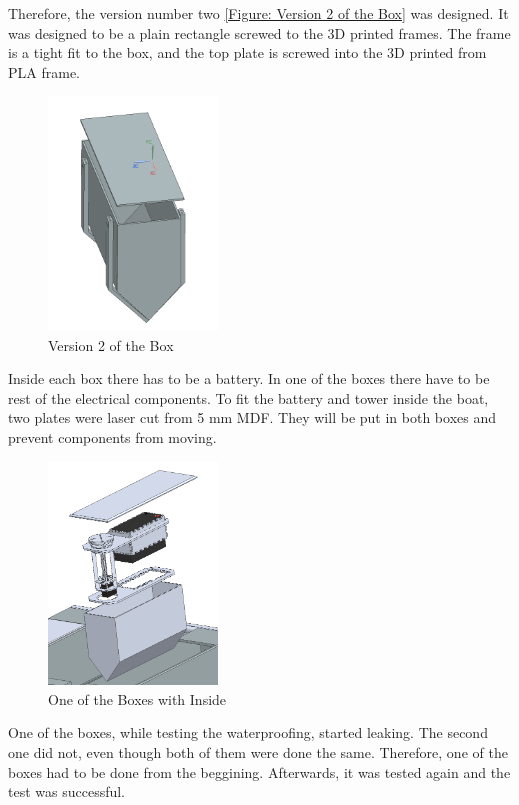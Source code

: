 Therefore, the version number two \autoref{Figure: Version 2 of the Box} was designed. It was designed to be a plain rectangle 
screwed to the 3D printed frames. The frame is a tight fit to the box, and the top plate is screwed into the 3D printed from PLA frame.
\begin{figure}[H]
    \centering
    \includegraphics[width=0.4\textwidth]{box_3.png}
    \caption{Version 2 of the Box}
    \label{Figure: Version 2 of the Box}
\end{figure} 

Inside each box there has to be a battery. In one of the boxes there have to be rest of the electrical components. To fit the battery and tower 
inside the boat, two plates were laser cut from 5 mm MDF. They will be put in both boxes and prevent components from moving. \\
\begin{figure}[H]
    \centering
    \includegraphics[width=0.4\textwidth]{box_2.png}
    \caption{One of the Boxes with Inside}
    \label{Figure: One of the boxes}
\end{figure} 
One of the boxes, while testing the waterproofing, started leaking. The second one did not, even though both of them were done the same. 
Therefore, one of the boxes had to be done from the beggining. Afterwards, it was tested again and the test was successful. 
